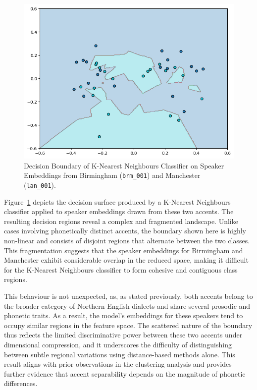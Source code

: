 \documentclass[conference]{IEEEtran}
\begin{document}
	\begin{figure}[h]
		\centering
		\includegraphics[width=1\linewidth]{img/img-knn-brm-lan.png}
		\caption{Decision Boundary of K-Nearest Neighbours Classifier on Speaker Embeddings from Birmingham (\texttt{brm\_001}) and Manchester (\texttt{lan\_001}).}
		\label{fig:knn-brm-lan}
	\end{figure}
	
	
	Figure~\ref{fig:knn-brm-lan} depicts the decision surface produced by a K-Nearest Neighbours classifier applied to speaker embeddings drawn from these two accents. The resulting decision regions reveal a complex and fragmented landscape. Unlike cases involving phonetically distinct accents, the boundary shown here is highly non-linear and consists of disjoint regions that alternate between the two classes. This fragmentation suggests that the speaker embeddings for Birmingham and Manchester exhibit considerable overlap in the reduced space, making it difficult for the K-Nearest Neighbours classifier to form cohesive and contiguous class regions.
	
	This behaviour is not unexpected, as, as stated previously,  both accents belong to the broader category of Northern English dialects and share several prosodic and phonetic traits. As a result, the model's embeddings for these speakers tend to occupy similar regions in the feature space. The scattered nature of the boundary thus reflects the limited discriminative power between these two accents under dimensional compression, and it underscores the difficulty of distinguishing between subtle regional variations using distance-based methods alone. This result aligns with prior observations in the clustering analysis and provides further evidence that accent separability depends on the magnitude of phonetic differences. 
	
\end{document}
